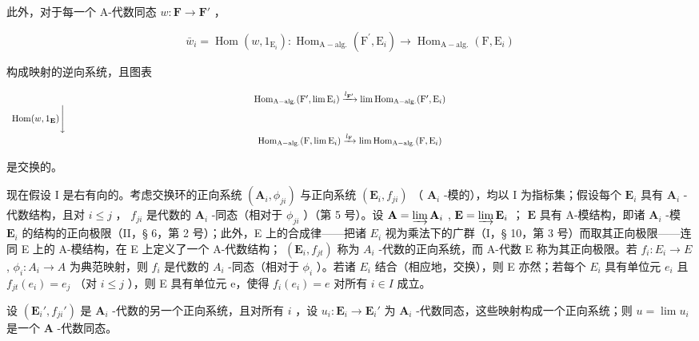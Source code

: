 此外，对于每一个 A-代数同态 \(w: \mathbf{F} \to \mathbf{F}'\) ，

\[
\bar {w} _ {i} = \operatorname{Hom} (w, 1 _ {\mathrm{E} _ {i}}): \operatorname{Hom} _ {\mathrm{A-alg.}} (\mathrm{F} ^ {\prime}, \mathrm{E} _ {i}) \rightarrow \operatorname{Hom} _ {\mathrm{A-alg.}} (\mathrm{F}, \mathrm{E} _ {i})
\]

构成映射的逆向系统，且图表

\[
\begin{array}{c} \operatorname{Hom} _ {\mathrm{A-alg.}} (\mathrm{F} ^ {\prime}, \lim \mathrm{E} _ {i}) \xrightarrow {l _ {\mathbf {F} ^ {\prime}}} \lim \operatorname{Hom} _ {\mathrm{A-alg.}} (\mathrm{F} ^ {\prime}, \mathrm{E} _ {i}) \\ \operatorname{Hom} (w, 1 _ {\mathbf {E}}) \Biggl \downarrow \qquad \qquad \qquad \qquad \qquad \qquad \qquad \qquad \qquad \qquad \qquad \qquad \qquad \qquad \qquad \qquad \qquad \qquad \qquad \qquad \qquad \qquad \qquad \qquad \qquad \qquad \qquad \qquad \qquad \qquad \qquad \qquad \qquad \qquad \\ \operatorname{Hom} _ {\mathrm{A-alg.}} (\mathrm{F}, \lim \mathrm{E} _ {i}) \xrightarrow {l _ {\mathbf {F}}} \lim \operatorname{Hom} _ {\mathrm{A-alg.}} (\mathrm{F}, \mathrm{E} _ {i}) \end{array}
\]

是交换的。

现在假设 I 是右有向的。考虑交换环的正向系统 \((\mathbf{A}_i, \phi_{ji})\) 与正向系统 \((\mathbf{E}_i, f_{ji})\) （ \(\mathbf{A}_i\) -模的），均以 I 为指标集；假设每个 \(\mathbf{E}_i\) 具有 \(\mathbf{A}_i\) -代数结构，且对 \(i \leqslant j\) ， \(f_{ji}\) 是代数的 \(\mathbf{A}_i\) -同态（相对于 \(\phi_{ji}\) ）（第 5 号）。设 \(\mathbf{A} = \varinjlim \mathbf{A}_i\) , \(\mathbf{E} = \varinjlim \mathbf{E}_i\) ； \(\mathbf{E}\) 具有 A-模结构，即诸 \(\mathbf{A}_i\) -模 \(\mathbf{E}_i\) 的结构的正向极限（II，§ 6，第 2 号）；此外，E 上的合成律——把诸 \(E_{i}\) 视为乘法下的广群（I，§ 10，第 3 号）而取其正向极限——连同 E 上的 A-模结构，在 E 上定义了一个 A-代数结构； \((\mathbf{E}_{i}, f_{jt})\) 称为 \(A_{i}\) -代数的正向系统，而 A-代数 E 称为其正向极限。若 \(f_{i}: E_{i} \to E\) , \(\phi_{i}: A_{i} \to A\) 为典范映射，则 \(f_{i}\) 是代数的 \(A_{i}\) -同态（相对于 \(\phi_{i}\) ）。若诸 \(E_{i}\) 结合（相应地，交换），则 E 亦然；若每个 \(E_{i}\) 具有单位元 \(e_{i}\) 且 \(f_{jt}(e_{i}) = e_{j}\) （对 \(i \leqslant j\) ），则 E 具有单位元 e，使得 \(f_{i}(e_{i}) = e\) 对所有 \(i \in I\) 成立。

设 \((\mathbf{E}_i', f_{ji}')\) 是 \(\mathbf{A}_i\) -代数的另一个正向系统，且对所有 \(i\) ，设 \(u_i: \mathbf{E}_i \to \mathbf{E}_i'\) 为 \(\mathbf{A}_i\) -代数同态，这些映射构成一个正向系统；则 \(u = \lim u_i\) 是一个 \(\mathbf{A}\) -代数同态。

